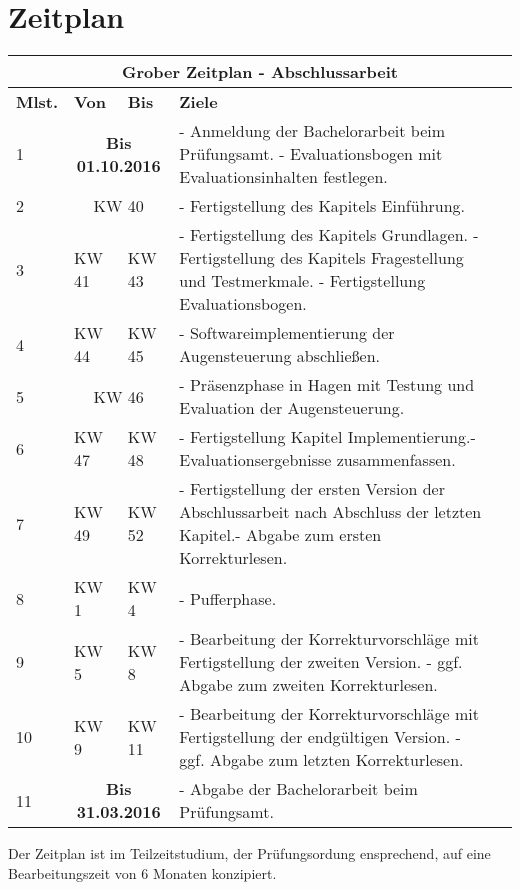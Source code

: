 \documentclass[11pt,a4paper,onecolumn,twoside,ngerman]{book}
\begin{document}
\section*{Zeitplan}
\begin{table}[htp]
\begin{longtable}{|p{1cm}|p{1.5cm}|p{1.5cm}|p{9cm}|p{0.5cm}|}
\multicolumn{5}{c}{\LARGE \bf{Grober Zeitplan -  Abschlussarbeit
}}  \\
\hline
\rowcolor{orange} \bf Mlst. & \bf Von & \bf Bis & \bf Ziele & \\



\hline
1 &\multicolumn{2}{|c|}{\bf Bis 01.10.2016} &  - Anmeldung der Bachelorarbeit beim Prüfungsamt.
\newline - Evaluationsbogen mit Evaluationsinhalten festlegen. 
& \\
\hline
2 & \multicolumn{2}{|c|}{KW 40} & - Fertigstellung des Kapitels Einführung.&\\ 
\hline
3 & KW 41 & KW 43 & - Fertigstellung des Kapitels Grundlagen. \newline - Fertigstellung des Kapitels Fragestellung und Testmerkmale.
\newline - Fertigstellung Evaluationsbogen. & \\
\hline
4 & KW 44 & KW 45 & - Softwareimplementierung der Augensteuerung abschließen. & \\
\hline
5 & \multicolumn{2}{|c|}{KW 46} & - Präsenzphase in Hagen mit Testung und Evaluation der Augensteuerung. & \\
\hline
6 & KW 47 & KW 48 & - Fertigstellung Kapitel Implementierung.\newline - Evaluationsergebnisse zusammenfassen. & \\
\hline
7 & KW 49 & KW 52 & - Fertigstellung der ersten Version der Abschlussarbeit nach Abschluss der letzten Kapitel.\newline - Abgabe zum ersten Korrekturlesen. & \\
\hline
8 & KW 1 & KW 4 & - Pufferphase.&\\
\hline
9 & KW 5 & KW 8 & - Bearbeitung der Korrekturvorschläge mit Fertigstellung der zweiten Version. 
\newline - ggf. Abgabe zum zweiten Korrekturlesen.& \\
\hline
10 & KW 9 & KW 11 & - Bearbeitung der Korrekturvorschläge mit Fertigstellung der endgültigen Version. \newline - ggf. Abgabe zum letzten Korrekturlesen. &\\
\hline
11 &\multicolumn{2}{|c|}{\bf Bis 31.03.2016} &  - Abgabe der Bachelorarbeit beim Prüfungsamt.& \\
\hline
\end{longtable}
\end{table}
\noindent Der Zeitplan ist im Teilzeitstudium, der Prüfungsordung ensprechend, auf eine Bearbeitungszeit von 6 Monaten konzipiert.
\end{document}
